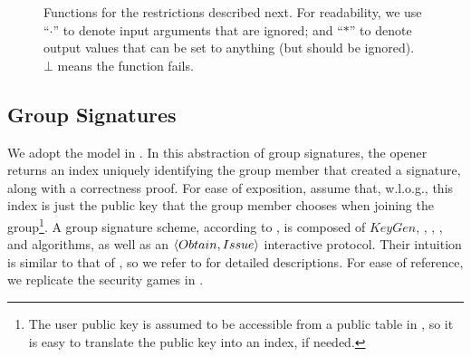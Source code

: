 \begin{figure}[ht!]
  \caption{Functions for the \CUASGen restrictions described next.
    For readability, we use ``$\cdot$'' to denote input arguments that are
    ignored; and ``$\ast$'' to denote output values that can be set to anything
    (but should be ignored). $\bot$ means the function fails.}
  \label{fig:func-restrictions}
\end{figure}

\subsection{Group Signatures}
\label{ssec:related-models-gs}

We adopt the model in \cite{bsz05}. In this abstraction
of group signatures, the opener returns an index uniquely identifying the group
member that created a signature, along with a correctness proof. For ease of
exposition, assume that, w.l.o.g., this index is just the public key that the
group member chooses when joining the group\footnote{The user public key is
  assumed to be accessible from a public table in \cite{bsz05}, so it is easy
  to translate the public key into an index, if needed.}. A group signature
scheme, according to \cite{bsz05}, is composed of $KeyGen$, \UKeyGen, \Sign,
\Verify, \Open and \Judge algorithms, as well as an $\langle Obtain,Issue
\rangle$ interactive protocol. Their intuition is similar to that of
\UAS, so we refer to \cite{bsz05} for detailed descriptions. For ease of
reference, we replicate the security games in .

